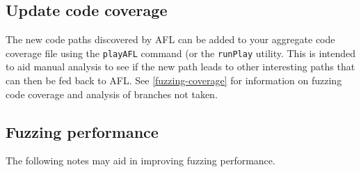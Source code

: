 \documentclass[titlepage]{article}
\begin{document}
\subsection{Update code coverage}
The new code paths discovered by AFL can be added to your aggregate code coverage file using the {\tt playAFL} command (or the {\tt runPlay} utility.  This is intended
to aid manual analysis to see if the new path leads to other interesting paths that can then be fed back to AFL.  
See \ref{fuzzing-coverage} for information on fuzzing code coverage and analysis of branches not taken.

\subsection{Fuzzing performance}
The following notes may aid in improving fuzzing performance.
\end{document}

